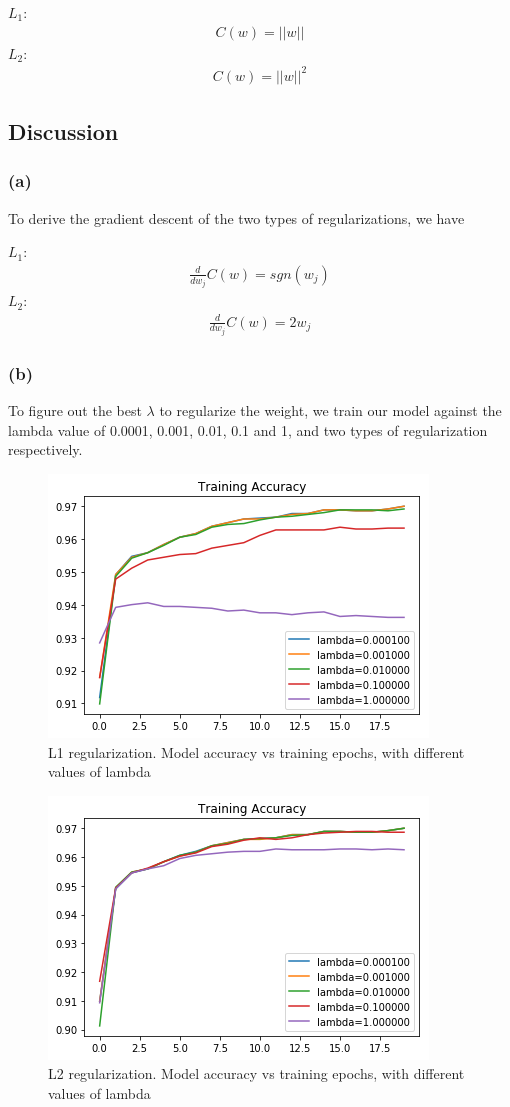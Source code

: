 \documentclass{article}
\begin{document}
 $L_1:$\begin{align*}
  C(w) = ||w||
  \end{align*}
 $L_2:$\begin{align*}
 C(w) = ||w||^2
 \end{align*}
\subsection{Discussion}
\subsubsection*{(a)} 
To derive the gradient descent of the two types of regularizations, we have 

$L_1$: \begin{align*}
\frac{d}{dw_j}C(w) = sgn(w_j) 
\end{align*}
$L_2$: \begin{align*}
\frac{d}{dw_j}C(w) = 2w_j 
\end{align*}
\subsubsection*{(b)} 
To figure out the best $\lambda$ to regularize the weight, we train our model against the lambda value of 0.0001, 0.001, 0.01, 0.1 and 1, and two types of regularization respectively.
\begin{figure}[h]
	\centering
	\includegraphics[scale = 0.7]{pics/lambda_train_1.png}
	\caption{L1 regularization. Model accuracy vs training epochs, with different values of lambda}
\end{figure}
\begin{figure}[h]
	\centering
	\includegraphics[scale = 0.7]{pics/lambda_train_2.png}
	\caption{L2 regularization. Model accuracy vs training epochs, with different values of lambda}
\end{figure}
\end{document}
